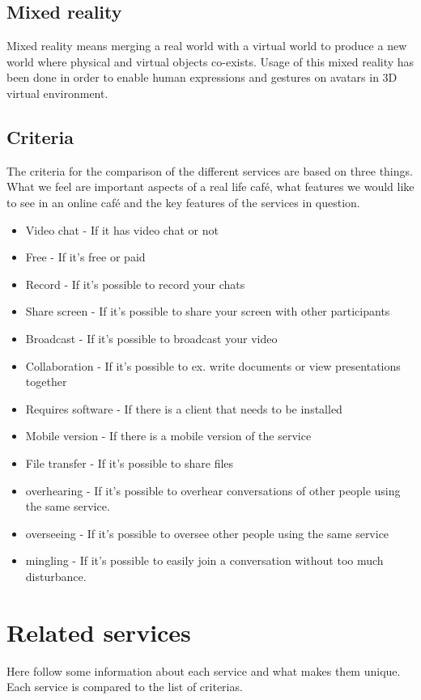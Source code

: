 \documentclass[12pt, titlepage]{article}
\begin{document}
\subsection{Mixed reality}
Mixed reality means merging a real world with a virtual world to produce a new world where physical and virtual objects co-exists. Usage of this mixed reality has been done in order to enable human expressions and gestures on avatars in 3D virtual environment\cite{9}.
\subsection{Criteria}
The criteria for the comparison of the different services are based on three things. What we feel are important aspects of a real life café, what features we would like to see in an online café and the key features of the services in question.
\begin{itemize}
\item Video chat - If it has video chat or not
\item Free - If it’s free or paid
\item Record - If it's possible to record your chats
\item Share screen - If it's possible to share your screen with other participants
\item Broadcast - If it's possible to broadcast your video
\item Collaboration - If it's possible to ex. write documents or view presentations together
\item Requires software - If there is a client that needs to be installed
\item Mobile version - If there is a mobile version of the service
\item File transfer - If it's possible to share files
\item overhearing - If it's possible to overhear conversations of other people using the same service.
\item overseeing - If it's possible to oversee other people using the same service
\item mingling - If it's possible to easily join a conversation without too much disturbance.
\end{itemize}
\section{Related services}
Here follow some information about each service and what makes them unique. Each service is compared to the list of criterias.
\end{document}
